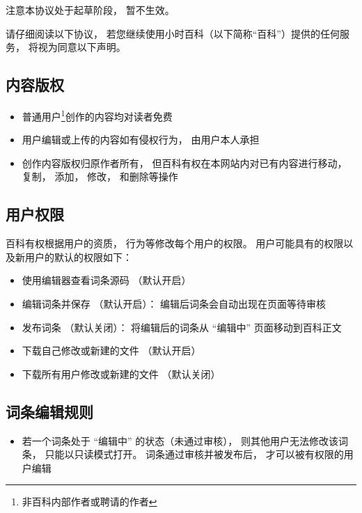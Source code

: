 
注意本协议处于起草阶段， 暂不生效。

请仔细阅读以下协议， 若您继续使用小时百科（以下简称“百科”）提供的任何服务， 将视为同意以下声明。

\subsection{内容版权}
\begin{itemize}
\item 普通用户\footnote{非百科内部作者或聘请的作者}创作的内容均对读者免费
\item 用户编辑或上传的内容如有侵权行为， 由用户本人承担
\item 创作内容版权归原作者所有， 但百科有权在本网站内对已有内容进行移动， 复制， 添加， 修改， 和删除等操作
\end{itemize}

\subsection{用户权限}
百科有权根据用户的资质， 行为等修改每个用户的权限。 用户可能具有的权限以及新用户的默认的权限如下：
\begin{itemize}
\item 使用编辑器查看词条源码 （默认开启）
\item 编辑词条并保存 （默认开启）： 编辑后词条会自动出现在页面等待审核
\item 发布词条 （默认关闭）： 将编辑后的词条从 “编辑中” 页面移动到百科正文
\item 下载自己修改或新建的文件 （默认开启）
\item 下载所有用户修改或新建的文件 （默认关闭）
\end{itemize}

\subsection{词条编辑规则}
\begin{itemize}
\item 若一个词条处于 “编辑中” 的状态（未通过审核）， 则其他用户无法修改该词条， 只能以只读模式打开。 词条通过审核并被发布后， 才可以被有权限的用户编辑
\end{itemize}
